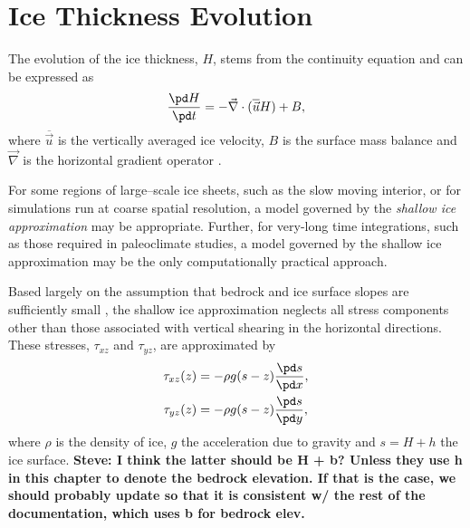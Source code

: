 \section{Ice Thickness Evolution}
\label{sc:glide_thickness_evolution}
The evolution of the ice thickness, $H$, stems from the continuity equation and can be expressed as
\begin{equation}
  \label{kin.eq.ice_thickness}
  \frac{\pd H}{\pd t} = -\vec\nabla\cdot(\overline{\vec{u}} H) + B,
\end{equation}
where $\overline{\vec{u}}$ is the vertically averaged ice velocity, $B$ is the surface mass balance and $\vec\nabla$ is the horizontal gradient operator \citep{Payne1997}. 

For some regions of large--scale ice sheets, such as the slow moving interior, or for simulations run at coarse spatial resolution, a model governed by the \emph{shallow ice approximation} may be appropriate. Further, for very-long time integrations, such as those required in paleoclimate studies, a model governed by the shallow ice approximation may
be the only computationally practical approach.

Based largely on the assumption that bedrock and ice surface slopes are sufficiently small \citep{Hutter1983}, the shallow ice approximation neglects all stress components other than those associated with vertical shearing in the horizontal directions. 
These stresses, $\tau_{xz}$ and $\tau_{yz}$, are approximated by
\begin{equation}
  \label{kin.eq.horiz_shear}
  \begin{split}
    \tau_{xz}(z)&=-\rho g(s-z)\frac{\pd s}{\pd x},\\
    \tau_{yz}(z)&=-\rho g(s-z)\frac{\pd s}{\pd y},
  \end{split}
\end{equation}
where $\rho$ is the density of ice, $g$ the acceleration due to gravity and $s=H+h$ the ice surface. \textbf{Steve: I think the latter should be H + b? Unless they use h in this chapter to denote the bedrock elevation. If that is the case, we should probably update so that it is consistent w/ the rest of the documentation, which uses b for bedrock elev.}

